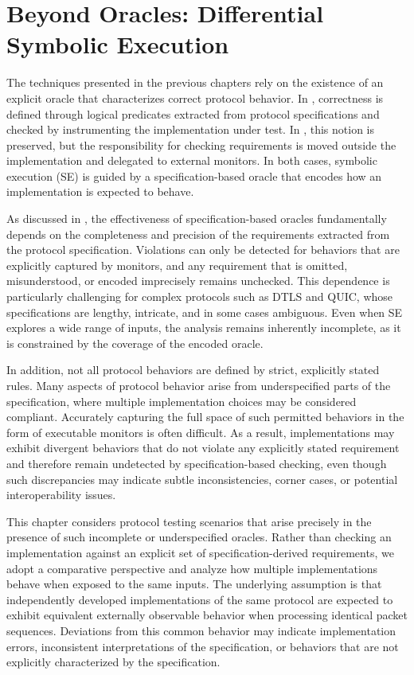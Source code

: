 \chapter{Beyond Oracles: Differential Symbolic Execution}\label{chapter:paper3}
The techniques presented in the previous chapters rely on the existence of an explicit oracle that characterizes correct protocol behavior.
In , correctness is defined through logical predicates extracted from protocol specifications and checked by instrumenting the implementation under test.
In , this notion is preserved, but the responsibility for checking requirements is moved outside the implementation and delegated to external monitors.
In both cases, symbolic execution (SE) is guided by a specification-based oracle that encodes how an implementation is expected to behave.

As discussed in , the effectiveness of specification-based oracles fundamentally depends on the completeness and precision of the requirements extracted from the protocol specification.
Violations can only be detected for behaviors that are explicitly captured by monitors, and any requirement that is omitted, misunderstood, or encoded imprecisely remains unchecked.
This dependence is particularly challenging for complex protocols such as DTLS and QUIC, whose specifications are lengthy, intricate, and in some cases ambiguous.
Even when SE explores a wide range of inputs, the analysis remains inherently incomplete, as it is constrained by the coverage of the encoded oracle.

In addition, not all protocol behaviors are defined by strict, explicitly stated rules.
Many aspects of protocol behavior arise from underspecified parts of the specification, where multiple implementation choices may be considered compliant.
Accurately capturing the full space of such permitted behaviors in the form of executable monitors is often difficult.
As a result, implementations may exhibit divergent behaviors that do not violate any explicitly stated requirement and therefore remain undetected by specification-based checking, even though such discrepancies may indicate subtle inconsistencies, corner cases, or potential interoperability issues.

This chapter considers protocol testing scenarios that arise precisely in the presence of such incomplete or underspecified oracles.
Rather than checking an implementation against an explicit set of specification-derived requirements, we adopt a comparative perspective and analyze how multiple implementations behave when exposed to the same inputs.
The underlying assumption is that independently developed implementations of the same protocol are expected to exhibit equivalent externally observable behavior when processing identical packet sequences.
Deviations from this common behavior may indicate implementation errors, inconsistent interpretations of the specification, or behaviors that are not explicitly characterized by the specification.


